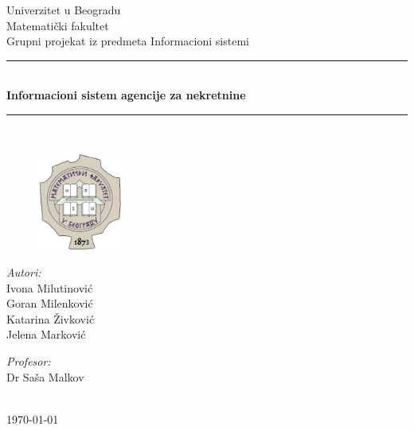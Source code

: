 \documentclass[20pt]{article}
\begin{document}
\begin{titlepage}

\newcommand{\HRule}{\rule{\linewidth}{0.5mm}}
\center
\textup{\Large Univerzitet u Beogradu\\Matemati\v{c}ki fakultet}\\[1.5cm]
\textup{\Large Grupni projekat iz predmeta Informacioni sistemi}\\[0.4cm]

\HRule \\[0.4cm]
{ \huge \bfseries Informacioni sistem agencije za nekretnine}\\[0.4cm]
\HRule \\[1.1cm]

\begin{figure}[h]
        \centering
        \includegraphics[width=0.25\textwidth,height=0.23\textheight]{Pictures/logo-fakulteta}
    \end{figure}
\vspace{4.2cm}

\begin{minipage}{0.4\textwidth}
\begin{flushleft}
\Large
\emph{Autori:}\\
Ivona Milutinovi\' c\\
Goran Milenkovi\' c\\
Katarina \v Zivkovi\' c\\
Jelena Markovi\' c

\end{flushleft}
\end{minipage}
\hfill
\begin{minipage}{0.4\textwidth}
\begin{flushright}
\Large
\emph{Profesor:} \\
Dr Sa\v sa Malkov\\
\end{flushright}
\end{minipage}\\[1.8cm]


{\Large \today}\\[1cm]
\vfill

\end{titlepage}
\end{document}
